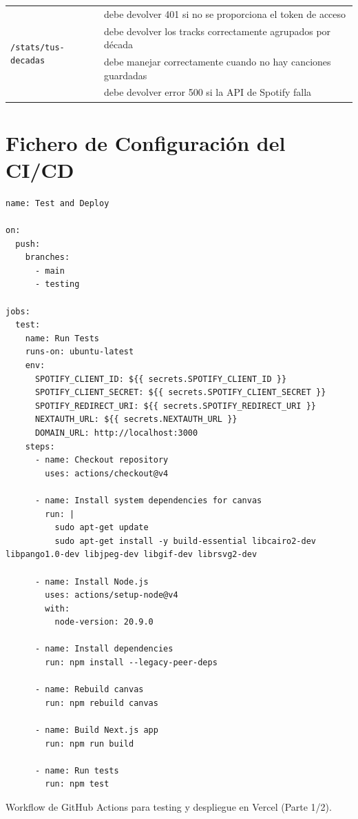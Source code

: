 \begin{longtable}{|p{5cm}|p{9cm}|}
  \multirow{4}{*}{\texttt{/stats/tus-decadas}}          & debe devolver 401 si no se proporciona el token de acceso                                \\ \cline{2-2}
                                                        & debe devolver los tracks correctamente agrupados por década                              \\ \cline{2-2}
                                                        & debe manejar correctamente cuando no hay canciones guardadas                             \\ \cline{2-2}
                                                        & debe devolver error 500 si la API de Spotify falla                                       \\ \hline
\end{longtable}

\chapter{Fichero de Configuración del CI/CD} \label{ch:anexoF}

\begin{ifalgorithm}[H]
  \begin{lstlisting}
name: Test and Deploy

on:
  push:
    branches:
      - main
      - testing

jobs:
  test:
    name: Run Tests
    runs-on: ubuntu-latest
    env:
      SPOTIFY_CLIENT_ID: ${{ secrets.SPOTIFY_CLIENT_ID }}
      SPOTIFY_CLIENT_SECRET: ${{ secrets.SPOTIFY_CLIENT_SECRET }}
      SPOTIFY_REDIRECT_URI: ${{ secrets.SPOTIFY_REDIRECT_URI }}
      NEXTAUTH_URL: ${{ secrets.NEXTAUTH_URL }}
      DOMAIN_URL: http://localhost:3000
    steps:
      - name: Checkout repository
        uses: actions/checkout@v4

      - name: Install system dependencies for canvas
        run: |
          sudo apt-get update
          sudo apt-get install -y build-essential libcairo2-dev libpango1.0-dev libjpeg-dev libgif-dev librsvg2-dev

      - name: Install Node.js
        uses: actions/setup-node@v4
        with:
          node-version: 20.9.0

      - name: Install dependencies
        run: npm install --legacy-peer-deps

      - name: Rebuild canvas
        run: npm rebuild canvas

      - name: Build Next.js app
        run: npm run build

      - name: Run tests
        run: npm test

      \end{lstlisting}
  \caption{Workflow de GitHub Actions para testing y despliegue en Vercel (Parte 1/2).}
  \label{alg:github_actions_1}
\end{ifalgorithm}

